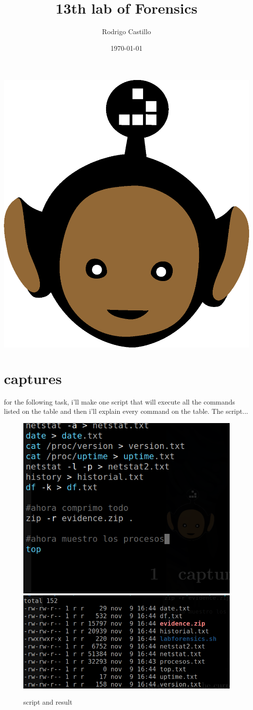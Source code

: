 \documentclass[10pt,a4paper]{article} %
\begin{document}
    \title{{  13th lab of Forensics  }}
    \author{{Rodrigo Castillo}}
    \date{\today}

    \maketitle


    \includegraphics[width=0.1\linewidth]{negro_cara.png}
    \section{captures}
    for the following task, i'll make one script that will execute all the
    commands listed on the table and then i'll explain every command on the
    table.
    The script...
    \begin{figure}[h!]
        \centering
        \includegraphics[width=0.5\linewidth]{script.png}
        \includegraphics[width=0.5\linewidth]{result.png}
        \caption{script and result}
        \label{script}
    \end{figure}
\end{document}

